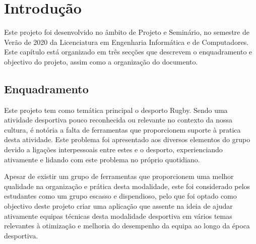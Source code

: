 %
%
%
\chapter{Introdução} \label{cap:intro}

Este projeto foi desenvolvido no âmbito de Projeto e Seminário, no semestre de Verão de 2020 da Licenciatura em Engenharia Informática e de Computadores. 
Este capítulo está organizado em três secções que descrevem o enquadramento e objectivo do projeto, assim como a organização do documento.


%
%
\section{Enquadramento\label{key}} \label{sec11}

%
Este projeto tem como temática principal o desporto Rugby. Sendo uma atividade desportiva pouco reconhecida ou relevante no contexto da nossa cultura, é notória a falta de ferramentas que proporcionem suporte à pratica desta atividade. Este problema foi apresentado aos diversos elementos do grupo devido a ligações interpessoais entre estes e o desporto, experienciando ativamente e lidando com este problema no próprio quotidiano.

Apesar de existir um grupo de ferramentas que proporcionem uma melhor qualidade na organização e prática desta modalidade, este foi considerado pelos estudantes como um grupo escasso e dispendioso, pelo que foi optado como objectivo deste projeto criar uma aplicação que assente na ideia de ajudar ativamente equipas técnicas desta modalidade desportiva em vários temas relevantes à otimização e melhoria do desempenho da equipa ao longo da época desportiva.



